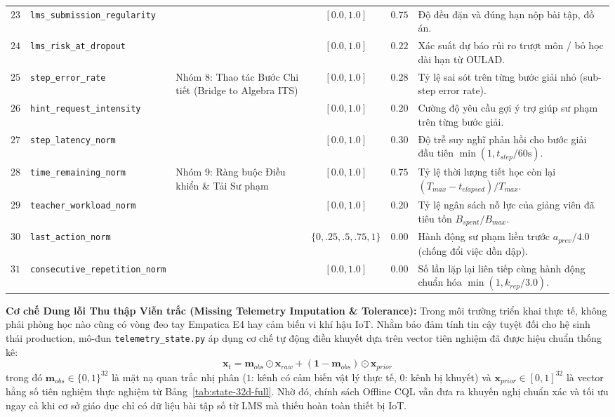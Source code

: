 \begin{table}[htbp]
\begin{tabularx}{\textwidth}{c p{3.6cm} p{3.2cm} c c X}
    $23$ & \texttt{lms\_submission\_regularity} & & $[0.0, 1.0]$ & $0.75$ & Độ đều đặn và đúng hạn nộp bài tập, đồ án. \\
    $24$ & \texttt{lms\_risk\_at\_dropout} & & $[0.0, 1.0]$ & $0.22$ & Xác suất dự báo rủi ro trượt môn / bỏ học dài hạn từ OULAD. \\
    \midrule
    $25$ & \texttt{step\_error\_rate} & \multirow{3}{3.2cm}{Nhóm 8: Thao tác Bước Chi tiết (Bridge to Algebra ITS)} & $[0.0, 1.0]$ & $0.28$ & Tỷ lệ sai sót trên từng bước giải nhỏ (sub-step error rate). \\
    $26$ & \texttt{hint\_request\_intensity} & & $[0.0, 1.0]$ & $0.20$ & Cường độ yêu cầu gợi ý trợ giúp sư phạm trên từng bước giải. \\
    $27$ & \texttt{step\_latency\_norm} & & $[0.0, 1.0]$ & $0.30$ & Độ trễ suy nghĩ phản hồi cho bước giải đầu tiên $\min(1, t_{step} / 60\text{s})$. \\
    \midrule
    $28$ & \texttt{time\_remaining\_norm} & \multirow{4}{3.2cm}{Nhóm 9: Ràng buộc Điều khiển \& Tải Sư phạm} & $[0.0, 1.0]$ & $0.75$ & Tỷ lệ thời lượng tiết học còn lại $(T_{max} - t_{elapsed}) / T_{max}$. \\
    $29$ & \texttt{teacher\_workload\_norm} & & $[0.0, 1.0]$ & $0.20$ & Tỷ lệ ngân sách nỗ lực của giảng viên đã tiêu tốn $B_{spent} / B_{max}$. \\
    $30$ & \texttt{last\_action\_norm} & & $\{0, .25, .5, .75, 1\}$ & $0.00$ & Hành động sư phạm liền trước $a_{prev} / 4.0$ (chống đổi việc dồn dập). \\
    $31$ & \texttt{consecutive\_repetition\_norm} & & $[0.0, 1.0]$ & $0.00$ & Số lần lặp lại liên tiếp cùng hành động chuẩn hóa $\min(1, k_{rep} / 3.0)$. \\
    \bottomrule
  \end{tabularx}
\end{table}

\noindent\textbf{Cơ chế Dung lỗi Thu thập Viễn trắc (Missing Telemetry Imputation \& Tolerance):} Trong môi trường triển khai thực tế, không phải phòng học nào cũng có vòng đeo tay Empatica E4 hay cảm biến vi khí hậu IoT. Nhằm bảo đảm tính tin cậy tuyệt đối cho hệ sinh thái production, mô-đun \texttt{telemetry\_state.py} áp dụng cơ chế tự động điền khuyết dựa trên vector tiên nghiệm đã được hiệu chuẩn thống kê:
\begin{equation}\label{eq:telemetry-imputation}
  \mathbf{x}_t = \mathbf{m}_{obs} \odot \mathbf{x}_{raw} + (\mathbf{1} - \mathbf{m}_{obs}) \odot \mathbf{x}_{prior}
\end{equation}
trong đó $\mathbf{m}_{obs} \in \{0, 1\}^{32}$ là mặt nạ quan trắc nhị phân ($1$: kênh có cảm biến vật lý thực tế, $0$: kênh bị khuyết) và $\mathbf{x}_{prior} \in [0, 1]^{32}$ là vector hằng số tiên nghiệm thực nghiệm từ Bảng~\ref{tab:state-32d-full}. Nhờ đó, chính sách Offline CQL vẫn đưa ra khuyến nghị chuẩn xác và tối ưu ngay cả khi cơ sở giáo dục chỉ có dữ liệu bài tập số từ LMS mà thiếu hoàn toàn thiết bị IoT.

